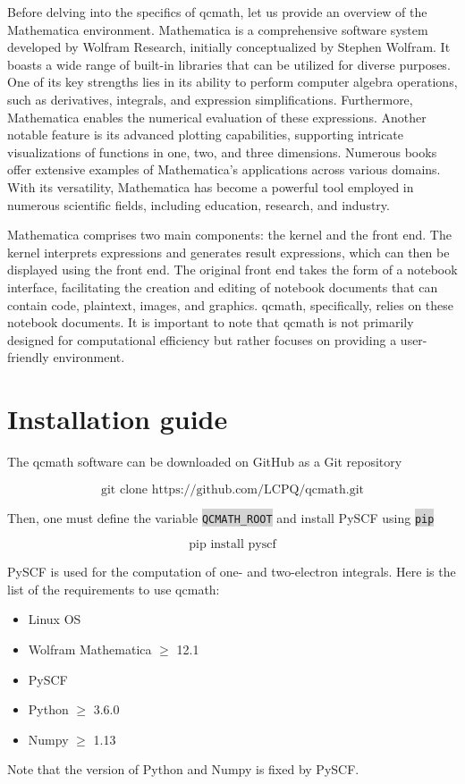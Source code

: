 \documentclass[aip,jcp,reprint,noshowkeys,superscriptaddress]{revtex4-1}
\newcommand{\keyword}[1]{{\colorbox{lightgray}{\texttt{#1}}}}
\begin{document}
Before delving into the specifics of qcmath, let us provide an overview of the Mathematica environment. Mathematica is a comprehensive software system developed by Wolfram Research, initially conceptualized by Stephen Wolfram. It boasts a wide range of built-in libraries that can be utilized for diverse purposes. One of its key strengths lies in its ability to perform computer algebra operations, such as derivatives, integrals, and expression simplifications. Furthermore, Mathematica enables the numerical evaluation of these expressions. Another notable feature is its advanced plotting capabilities, supporting intricate visualizations of functions in one, two, and three dimensions. Numerous books offer extensive examples of Mathematica's applications across various domains. With its versatility, Mathematica has become a powerful tool employed in numerous scientific fields, including education, research, and industry.

Mathematica comprises two main components: the kernel and the front end. The kernel interprets expressions and generates result expressions, which can then be displayed using the front end. The original front end takes the form of a notebook interface, facilitating the creation and editing of notebook documents that can contain code, plaintext, images, and graphics. qcmath, specifically, relies on these notebook documents. It is important to note that qcmath is not primarily designed for computational efficiency but rather focuses on providing a user-friendly environment.

\section{Installation guide}
The qcmath software can be downloaded on GitHub as a Git repository
\begin{tcolorbox}[colback=lightgray,colframe=white]
\begin{equation*}
\text{git clone https://github.com/LCPQ/qcmath.git}
\end{equation*}
\end{tcolorbox}
Then, one must define the variable \keyword{QCMATH\_ROOT} and install PySCF using \keyword{pip}
\begin{tcolorbox}[colback=lightgray,colframe=white]
\begin{equation*}
\text{pip install pyscf}
\end{equation*}
\end{tcolorbox}
PySCF is used for the computation of one- and two-electron integrals. Here is the list of the requirements to use qcmath:
\begin{itemize}
\item Linux OS
\item Wolfram Mathematica $\geq$ 12.1
\item PySCF
\item Python $\geq$ 3.6.0 
\item Numpy $\geq$ 1.13
\end{itemize}
Note that the version of Python and Numpy is fixed by PySCF.
\end{document}
